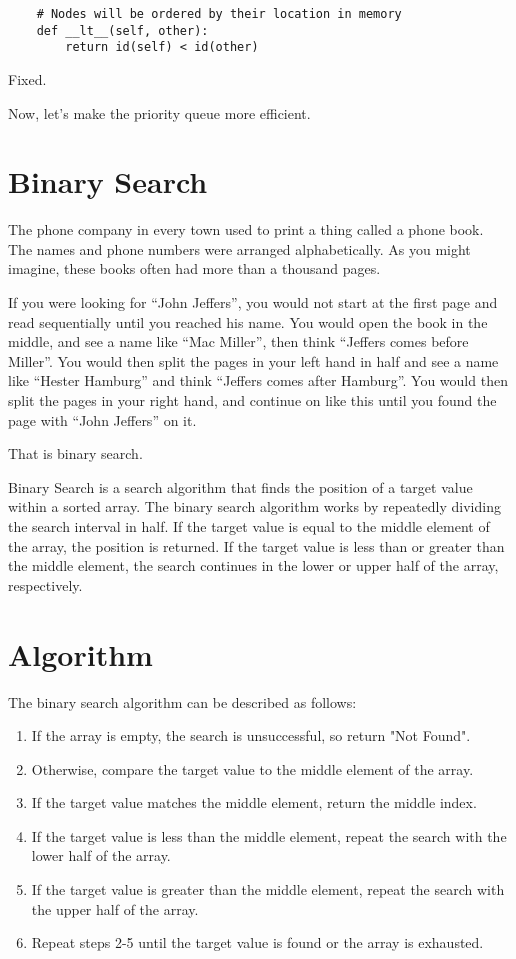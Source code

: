 \begin{verbatim}
    # Nodes will be ordered by their location in memory
    def __lt__(self, other):
        return id(self) < id(other)
\end{verbatim}

Fixed.

Now, let's make the priority queue more efficient.

\section{Binary Search}

The phone company in every town used to print a thing called a phone
book. The names and phone numbers were arranged alphabetically.  As
you might imagine, these books often had more than a thousand pages.

If you were looking for ``John Jeffers'', you would not start at the
first page and read sequentially until you reached his name.  You
would open the book in the middle, and see a name like ``Mac Miller'',
then think ``Jeffers comes before Miller''. You would then split
the pages in your left hand in half and see a name like ``Hester
Hamburg'' and think ``Jeffers comes after Hamburg''. You would then
split the pages in your right hand, and continue on like this until you found the page
with ``John Jeffers'' on it.

That is binary search.

Binary Search is a search algorithm that finds the position of a target value within a sorted array. The binary search algorithm works by repeatedly dividing the search interval in half. If the target value is equal to the middle element of the array, the position is returned. If the target value is less than or greater than the middle element, the search continues in the lower or upper half of the array, respectively.

\section{Algorithm}

The binary search algorithm can be described as follows:

\begin{enumerate}
\item If the array is empty, the search is unsuccessful, so return "Not Found".
\item Otherwise, compare the target value to the middle element of the array.
\item If the target value matches the middle element, return the middle index.
\item If the target value is less than the middle element, repeat the search with the lower half of the array.
\item If the target value is greater than the middle element, repeat the search with the upper half of the array.
\item Repeat steps 2-5 until the target value is found or the array is exhausted.
\end{enumerate}


